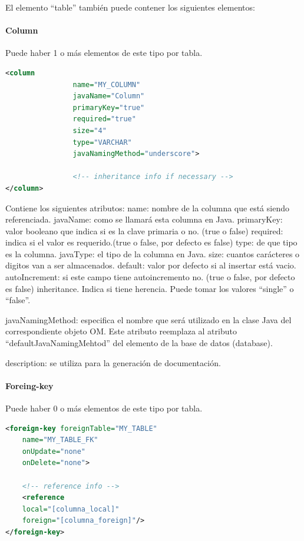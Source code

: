 \documentclass[12pt, oneside]{article}
\begin{document}
El elemento “table” también puede contener los siguientes elementos:

\paragraph{Column}
Puede haber 1 o más elementos de este tipo por tabla.

\begin{lstlisting}[language=xml]
<column
           		name="MY_COLUMN"
           		javaName="Column"
           		primaryKey="true"
           		required="true"
           		size="4"
           		type="VARCHAR"
           		javaNamingMethod="underscore">

           		<!-- inheritance info if necessary -->
</column>
\end{lstlisting}

Contiene los siguientes atributos:
name: nombre de la columna que está siendo referenciada.
javaName: como se llamará esta columna en Java.
primaryKey: valor booleano que indica si es la clave primaria o no. (true o false)
required: indica si el valor es requerido.(true o false, por defecto es false)
type: de que tipo es la columna.
javaType: el tipo de la columna en Java.
size: cuantos carácteres o digitos van a ser almacenados.
default: valor por defecto si al insertar está vacio.
autoIncrement: si este campo tiene autoincremento no. (true o false, por defecto es false)
inheritance. Indica si tiene herencia. Puede tomar los valores “single” o “false”.

javaNamingMethod: especifica el nombre que será utilizado en la clase Java del correspondiente objeto OM. Este atributo reemplaza al atributo “defaultJavaNamingMehtod” del elemento de la base de datos (database).

description: se utiliza para la generación de documentación.

\paragraph{Foreing-key}
Puede haber 0 o más elementos de este tipo por tabla.

\begin{lstlisting}[language=xml]
<foreign-key foreignTable="MY_TABLE"
	name="MY_TABLE_FK"
	onUpdate="none"
	onDelete="none">
	
	<!-- reference info -->
	<reference
	local="[columna_local]"
	foreign="[columna_foreign]"/>
</foreign-key>
\end{lstlisting}
\end{document}
